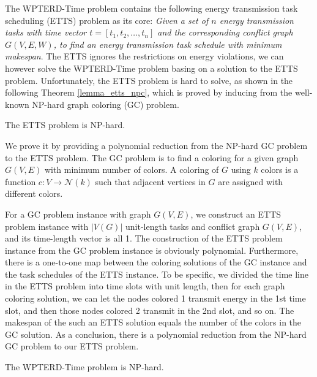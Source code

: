 \documentclass[journal,10pt]{IEEEtran}
\begin{document}
The WPTERD-Time problem contains the following energy transmission task scheduling (ETTS) problem as its core: \textit{Given a set of $n$ energy transmission tasks with time vector $t{=}[t_1,t_2,\ldots,t_n]$ and the corresponding conflict graph $G(V,E,W)$, to find an energy transmission task schedule with minimum makespan}. The ETTS ignores the restrictions on energy violations, we can however solve the WPTERD-Time problem basing on a solution to the ETTS problem. Unfortunately, the ETTS problem is hard to solve, as shown in the following Theorem \ref{lemma_etts_npc}, which is proved by inducing from the well-known NP-hard graph coloring (GC) problem.

\begin{theorem}
\label{lemma_etts_npc}
The ETTS problem is NP-hard.
\end{theorem}

\begin{IEEEproof}
We prove it by providing a polynomial reduction from the NP-hard GC problem to the ETTS problem. The GC problem is to find a coloring for a given graph $G(V,E)$ with minimum number of colors. A coloring of $G$ using $k$ colors is a function $c{:}V{\rightarrow}\mathcal{N}(k)$ such that adjacent vertices in $G$ are assigned with different colors.

For a GC problem instance with graph $G(V,E)$, we construct an ETTS problem instance with $|V(G)|$ unit-length tasks and conflict graph $G(V,E)$, and its time-length vector is all 1. The construction of the ETTS problem instance from the GC problem instance is obviously polynomial. Furthermore, there is a one-to-one map between the coloring solutions of the GC instance and the task schedules of the ETTS instance. To be specific, we divided the time line in the ETTS problem into time slots with unit length, then for each graph coloring solution, we can let the nodes colored 1 transmit energy in the 1st time slot, and then those nodes colored 2 transmit in the 2nd slot, and so on. The makespan of the such an ETTS solution equals the number of the colors in the GC solution. As a conclusion, there is a polynomial reduction from the NP-hard GC problem to our ETTS problem.
\end{IEEEproof}

\begin{theorem}
\label{lemma_wpterd_time_npc}
The WPTERD-Time problem is NP-hard.
\end{theorem}
\end{document}
